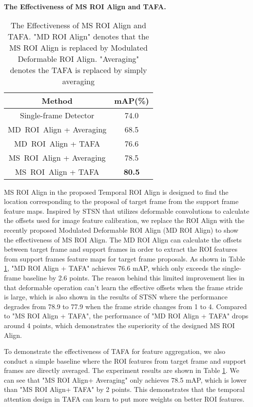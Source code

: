 \documentclass[letterpaper]{article} \usepackage{aaai21}  \usepackage{times}  \usepackage{helvet} \usepackage{courier}  \usepackage[hyphens]{url}  \usepackage{graphicx} \usepackage{hyperref}
\begin{document}
\noindent\textbf{The Effectiveness of MS ROI Align and TAFA.}
\begin{table}[t]
\begin{center}
\begin{tabular}{c|c}
  \hline
  \hline
  Method & mAP(\%) \\
  \hline
  \hline
  Single-frame Detector & 74.0 \\
  \hline
  MD\ ROI\ Align + Averaging & 68.5\\
  MD\ ROI\ Align + TAFA & 76.6\\
  MS\ ROI\ Align + Averaging & 78.5\\
  MS\ ROI\ Align + TAFA & \textbf{80.5}\\
  \hline
  \hline
\end{tabular}
\end{center}
\vspace{-0.3cm}
\caption{The Effectiveness of MS ROI Align and TAFA. "MD ROI Align" denotes that the MS ROI Align is replaced by Modulated Deformable ROI Align. "Averaging" denotes the TAFA is replaced by simply averaging}
\label{t:temporal_roi}
\end{table}
MS ROI Align in the proposed Temporal ROI Align is designed to find the location corresponding to the proposal of target frame from the support frame feature maps. Inspired by STSN \cite{bertasius2018object} that utilizes deformable convolutions to calculate the offsets used for image feature calibration, we replace the ROI Align with the recently proposed Modulated Deformable ROI Align \cite{zhu2019deformable} (MD ROI Align) to show the effectiveness of MS ROI Align. The MD ROI Align can calculate the offsets between target frame and support frames in order to extract the ROI features from support frames feature maps for target frame proposals. As shown in Table \ref{t:temporal_roi}, "MD ROI Align + TAFA" achieves 76.6 mAP, which only exceeds the single-frame baseline by 2.6 points. The reason behind this limited improvement lies in that deformable operation can't learn the effective offsets when the frame stride is large, which is also shown in the results of STSN \cite{bertasius2018object} where the performance degrades from 78.9 to 77.9 when the frame stride changes from 1 to 4. Compared to "MS ROI Align + TAFA", the performance of "MD ROI Align + TAFA" drops around 4 points, which demonstrates the superiority of the designed MS ROI Align.


To demonstrate the effectiveness of TAFA for feature aggregation, we also conduct a simple baseline where the ROI features from target frame and support frames are directly averaged. The experiment results are shown in Table \ref{t:temporal_roi}. We can see that "MS ROI Align+ Averaging" only achieves 78.5 mAP, which is lower than "MS ROI Align+ TAFA" by 2 points. This demonstrates that the temporal attention design in TAFA can learn to put more weights on better ROI features.
\end{document}
